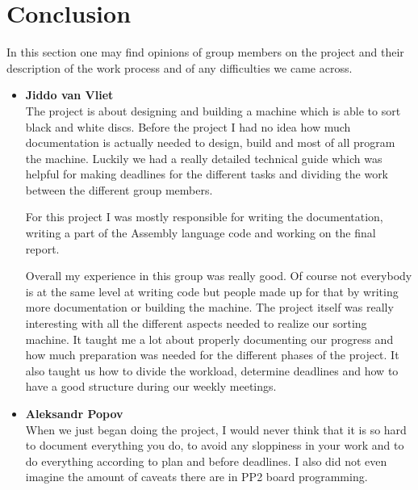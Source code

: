 \documentclass[a4paper,oneside,11pt]{report}
\begin{document}
\chapter{Conclusion}
In this section one may find opinions of group members on the project and their description of the work process and of any difficulties we came across.
\begin{itemize}
\item \textbf{Jiddo van Vliet}\\
The project is about designing and building a machine which is able to sort black and white discs. Before the project I had no idea how much documentation is actually needed to design, build and most of all program the machine. Luckily we had a really detailed technical guide which was helpful for making deadlines for the different tasks and dividing the work between the different group members.

For this project I was mostly responsible for writing the documentation, writing a part of the Assembly language code and working on the final report.

Overall my experience in this group was really good. Of course not everybody is at the same level at writing code but people made up for that by writing more documentation or building the machine. The project itself was really interesting with all the different aspects needed to realize our sorting machine. It taught me a lot about properly documenting our progress and how much preparation was needed for the different phases of the project. It also taught us how to divide the workload, determine deadlines and how to have a good structure during our weekly meetings.

\item \textbf{Aleksandr Popov}\\
When we just began doing the project, I would never think that it is so hard to document everything you do, to avoid any sloppiness in your work and to do everything according to plan and before deadlines. I also did not even imagine the amount of caveats there are in PP2 board programming.


\end{itemize}
\end{document}

